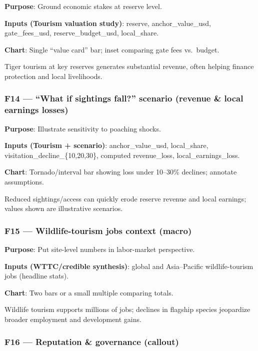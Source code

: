 \documentclass[
]{article}
\begin{document}
\textbf{Purpose}: Ground economic stakes at reserve level.

\textbf{Inputs (Tourism valuation study)}: reserve, anchor\_value\_usd,
gate\_fees\_usd, reserve\_budget\_usd, local\_share.

\textbf{Chart}: Single ``value card'' bar; inset comparing gate fees
vs.~budget.

Tiger tourism at key reserves generates substantial revenue, often
helping finance protection and local livelihoods.

\subsubsection{F14 --- ``What if sightings fall?'' scenario (revenue \&
local earnings
losses)}\label{f14-what-if-sightings-fall-scenario-revenue-local-earnings-losses}

\textbf{Purpose}: Illustrate sensitivity to poaching shocks.

\textbf{Inputs (Tourism + scenario)}: anchor\_value\_usd, local\_share,
visitation\_decline\_\{10,20,30\}, computed revenue\_loss,
local\_earnings\_loss.

\textbf{Chart}: Tornado/interval bar showing loss under 10--30\%
declines; annotate assumptions.

Reduced sightings/access can quickly erode reserve revenue and local
earnings; values shown are illustrative scenarios.

\subsubsection{F15 --- Wildlife-tourism jobs context
(macro)}\label{f15-wildlife-tourism-jobs-context-macro}

\textbf{Purpose}: Put site-level numbers in labor-market perspective.

\textbf{Inputs (WTTC/credible synthesis)}: global and Asia--Pacific
wildlife-tourism jobs (headline stats).

\textbf{Chart}: Two bars or a small multiple comparing totals.

Wildlife tourism supports millions of jobs; declines in flagship species
jeopardize broader employment and development gains.

\subsubsection{F16 --- Reputation \& governance
(callout)}\label{f16-reputation-governance-callout}
\end{document}
